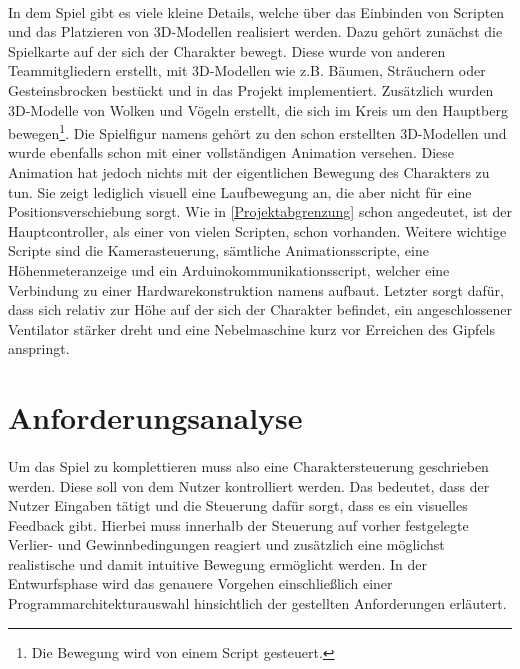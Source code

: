 \paragraph{}
In dem Spiel gibt es viele kleine Details, welche über das Einbinden von Scripten und das Platzieren von 3D-Modellen realisiert werden. Dazu gehört zunächst die Spielkarte auf der sich der Charakter bewegt. Diese wurde von anderen Teammitgliedern erstellt, mit 3D-Modellen wie z.B. Bäumen, Sträuchern oder Gesteinsbrocken bestückt und in das Projekt implementiert. Zusätzlich wurden 3D-Modelle von Wolken und Vögeln erstellt, die sich im Kreis um den Hauptberg bewegen\footnote{Die Bewegung wird von einem Script gesteuert.}.
Die Spielfigur namens  gehört zu den schon erstellten 3D-Modellen und wurde ebenfalls schon mit einer vollständigen Animation versehen. Diese Animation hat jedoch nichts mit der eigentlichen Bewegung des Charakters zu tun. Sie zeigt lediglich visuell eine Laufbewegung an, die aber nicht für eine Positionsverschiebung sorgt. 
Wie in \autoref{Projektabgrenzung}  schon angedeutet, ist der Hauptcontroller, als einer von vielen Scripten, schon vorhanden. Weitere wichtige Scripte sind die Kamerasteuerung, sämtliche Animationsscripte, eine Höhenmeteranzeige und ein Arduinokommunikationsscript, welcher eine Verbindung zu einer Hardwarekonstruktion namens  aufbaut. Letzter sorgt dafür, dass sich relativ zur Höhe auf der sich der Charakter befindet, ein angeschlossener Ventilator stärker dreht und eine Nebelmaschine kurz vor Erreichen des Gipfels anspringt.

\section{Anforderungsanalyse}
\paragraph{}
Um das Spiel zu komplettieren muss also eine Charaktersteuerung geschrieben werden. Diese soll von dem Nutzer kontrolliert werden. Das bedeutet, dass der Nutzer Eingaben tätigt und die Steuerung dafür sorgt, dass es ein visuelles Feedback gibt. Hierbei muss innerhalb der Steuerung auf vorher festgelegte Verlier- und Gewinnbedingungen reagiert und zusätzlich eine möglichst realistische und damit intuitive Bewegung ermöglicht werden. In der Entwurfsphase wird das genauere Vorgehen einschließlich einer Programmarchitekturauswahl hinsichtlich der gestellten Anforderungen erläutert.


